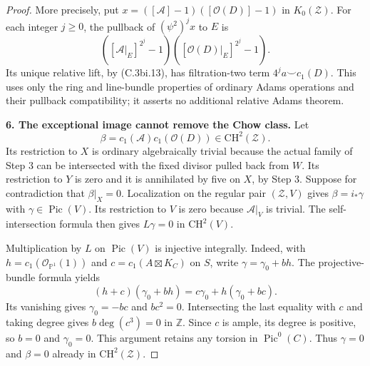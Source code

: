 \begin{proof}
More precisely, put $x=([\mathcal A]-1)([\mathcal O(D)]-1)$ in
$K_0(\mathcal Z)$. For each integer $j\ge0$, the pullback of
$(\psi^2)^j x$ to $E$ is
\[
 ([\mathcal A|_E]^{2^j}-1)
 ([\mathcal O(D)|_E]^{2^j}-1).
\]
Its unique relative lift, by (C.3bi.13), has filtration-two term
$4^j a\smile c_1(D)$. This uses only the ring and line-bundle
properties of ordinary Adams operations and their pullback
compatibility; it asserts no additional relative Adams theorem.

\textbf{6. The exceptional image cannot remove the Chow class.}
Let
\[
 \beta=c_1(\mathcal A)c_1(\mathcal O(D))\in\mathrm{CH}^2(\mathcal Z).
\]
Its restriction to $X$ is ordinary algebraically trivial because the
actual family of Step 3 can be intersected with the fixed divisor
pulled back from $W$. Its restriction to $Y$ is zero and it is
annihilated by five on $X$, by Step 3.
Suppose for contradiction that $\beta|_X=0$. Localization on the
regular pair $(\mathcal Z,V)$ gives $\beta=i_*\gamma$ with
$\gamma\in\operatorname{Pic}(V)$. Its restriction to $V$ is zero
because $\mathcal A|_V$ is trivial. The self-intersection formula
then gives $L\gamma=0$ in $\mathrm{CH}^2(V)$.

Multiplication by $L$ on $\operatorname{Pic}(V)$ is injective
integrally. Indeed, with $h=c_1(\mathcal O_{\mathbb P^1}(1))$ and
$c=c_1(A\boxtimes K_C)$ on $S$, write
$\gamma=\gamma_0+b h$. The projective-bundle formula yields
\[
 (h+c)(\gamma_0+bh)=c\gamma_0+h(\gamma_0+bc).
\]
Its vanishing gives $\gamma_0=-bc$ and $bc^2=0$. Intersecting the
last equality with $c$ and taking degree gives $b\deg(c^3)=0$ in
$\mathbb Z$. Since $c$ is ample, its degree is positive, so $b=0$
and $\gamma_0=0$. This argument retains any torsion in
$\operatorname{Pic}^0(C)$. Thus $\gamma=0$ and $\beta=0$ already
in $\mathrm{CH}^2(\mathcal Z)$.


\end{proof}
